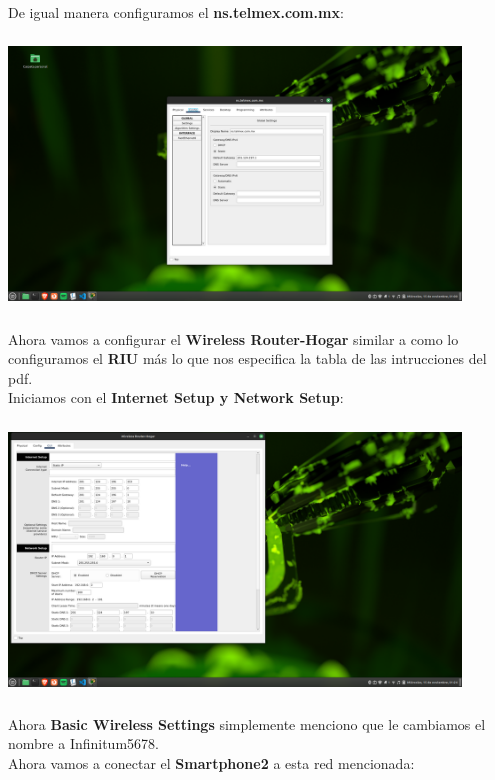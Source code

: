 \documentclass[14pt]{book}
\begin{document}
De igual manera configuramos el \textbf{ns.telmex.com.mx}:\\

\includegraphics[width=12cm, height=8cm]{images/dnstelmex.png}\\

Ahora vamos a configurar el \textbf{Wireless Router-Hogar} similar a como lo configuramos el \textbf{RIU} más lo que nos especifica la tabla de las intrucciones del pdf.\\

Iniciamos con el \textbf{Internet Setup y Network Setup}:\\

\includegraphics[width=12cm, height=8cm]{images/confiwireles.png}\\

Ahora \textbf{Basic Wireless Settings} simplemente menciono que le cambiamos el nombre a \textsf{Infinitum5678}.\\

Ahora vamos a conectar el \textbf{ Smartphone2} a esta red mencionada:\\
\end{document}
